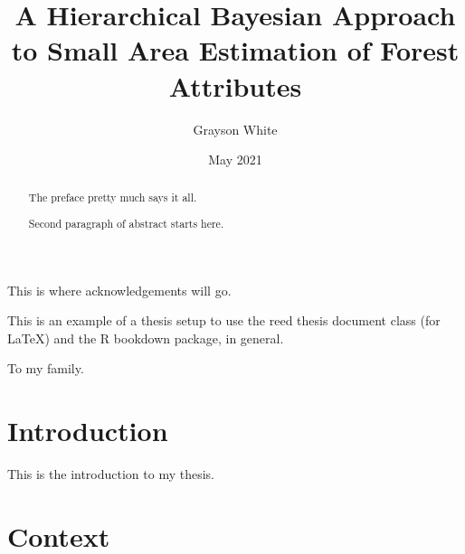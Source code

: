 \documentclass[12pt,twoside]{reedthesis}
\title{A Hierarchical Bayesian Approach to Small Area Estimation of Forest Attributes}
\author{Grayson White}
\date{May 2021}
\begin{document}
  \maketitle

\frontmatter %
\pagestyle{empty} %
  \begin{acknowledgements}
    This is where acknowledgements will go.
  \end{acknowledgements}
  \begin{preface}
    This is an example of a thesis setup to use the reed thesis document class
    (for LaTeX) and the R bookdown package, in general.
  \end{preface}
  \hypersetup{linkcolor=black}
  \setcounter{tocdepth}{2}
  \tableofcontents

  \listoftables

  \listoffigures
  \begin{abstract}
    The preface pretty much says it all.
    
    \par
    
    Second paragraph of abstract starts here.
  \end{abstract}
  \begin{dedication}
    To my family.
  \end{dedication}
\mainmatter %
\pagestyle{fancyplain} %

\hypertarget{introduction}{%
\chapter*{Introduction}\label{introduction}}

This is the introduction to my thesis.

\hypertarget{context}{%
\chapter{Context}\label{context}}
\end{document}

